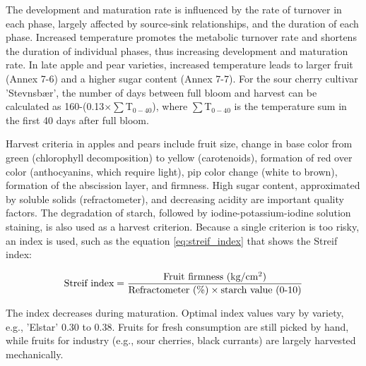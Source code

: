 \vspace{0.5em}
The development and maturation rate is influenced by the rate of turnover in each phase, largely affected by source-sink relationships, and the duration of each phase. Increased temperature promotes the metabolic turnover rate and shortens the duration of individual phases, thus increasing development and maturation rate. In late apple and pear varieties, increased temperature leads to larger fruit (Annex 7-6) and a higher sugar content (Annex 7-7). For the sour cherry cultivar 'Stevnsbær', the number of days between full bloom and harvest can be calculated as 160-(0.13$\times \sum$T$_{0-40}$), where $\sum$T$_{0-40}$ is the temperature sum in the first 40 days after full bloom.

\vspace{0.5em}
Harvest criteria in apples and pears include fruit size, change in base color from green (chlorophyll decomposition) to yellow (carotenoids), formation of red over color (anthocyanins, which require light), pip color change (white to brown), formation of the abscission layer, and firmness. High sugar content, approximated by soluble solids (refractometer), and decreasing acidity are important quality factors. The degradation of starch, followed by iodine-potassium-iodine solution staining, is also used as a harvest criterion. Because a single criterion is too risky, an index is used, such as the equation \ref{eq:streif_index} that shows the Streif index: 

\begin{equation}
\text{Streif index} = 
\frac   {\text{Fruit firmness (kg/cm$^2$)}}
        {\text{Refractometer (\%\text)} \times \text{starch value (0-10)}}
\label{eq:streif_index}
\end{equation}

\vspace{0.5em}
The index decreases during maturation. Optimal index values vary by variety, e.g., 'Elstar' 0.30 to 0.38. Fruits for fresh consumption are still picked by hand, while fruits for industry (e.g., sour cherries, black currants) are largely harvested mechanically.
